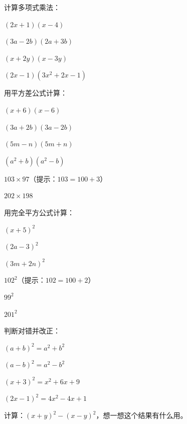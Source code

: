 \begin{exercise}
\item 计算多项式乘法：
  \begin{subexercise}
    \item $(2x+1)(x-4)$
    \item $(3a-2b)(2a+3b)$
    \item $(x+2y)(x-3y)$
    \item $(2x-1)(3x^2+2x-1)$
  \end{subexercise}

\item 用平方差公式计算：
  \begin{subexercise}
    \item $(x+6)(x-6)$
    \item $(3a+2b)(3a-2b)$
    \item $(5m-n)(5m+n)$
    \item $(a^2+b)(a^2-b)$
    \item $103\times97$（提示：$103=100+3$）
    \item $202\times198$
  \end{subexercise}

\item 用完全平方公式计算：
  \begin{subexercise}
    \item $(x+5)^2$
    \item $(2a-3)^2$
    \item $(3m+2n)^2$
    \item $102^2$（提示：$102=100+2$）
    \item $99^2$
    \item $201^2$
  \end{subexercise}

\item 判断对错并改正：
  \begin{subexercise}
    \item $(a+b)^2 = a^2 + b^2$
    \item $(a-b)^2 = a^2 - b^2$
    \item $(x+3)^2 = x^2 + 6x + 9$
    \item $(2x-1)^2 = 4x^2 - 4x + 1$
  \end{subexercise}

\item 计算：$(x+y)^2 - (x-y)^2$，想一想这个结果有什么用。
\end{exercise}


